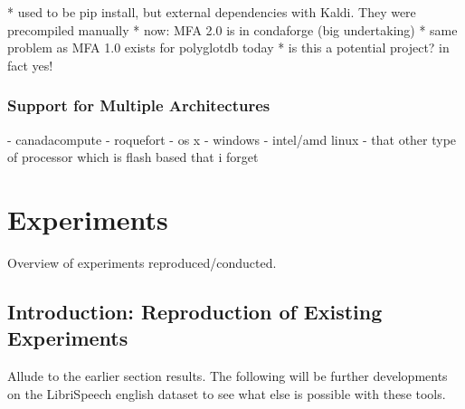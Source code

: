 \documentclass[11pt]{article}
\begin{document}
* used to be pip install, but external dependencies with Kaldi. They were precompiled manually
* now: MFA 2.0 is in condaforge (big undertaking)
* same problem as MFA 1.0 exists for polyglotdb today
* is this a potential project? in fact yes!

\subsubsection{Support for Multiple Architectures}

- canadacompute
- roquefort
- os x
- windows
- intel/amd linux
- that other type of processor which is flash based that i forget

\section{Experiments}

Overview of experiments reproduced/conducted.

\subsection{Introduction: Reproduction of Existing Experiments}

Allude to the earlier section results. The following will be further developments on the LibriSpeech english dataset to see what else is possible with these tools.
\end{document}
